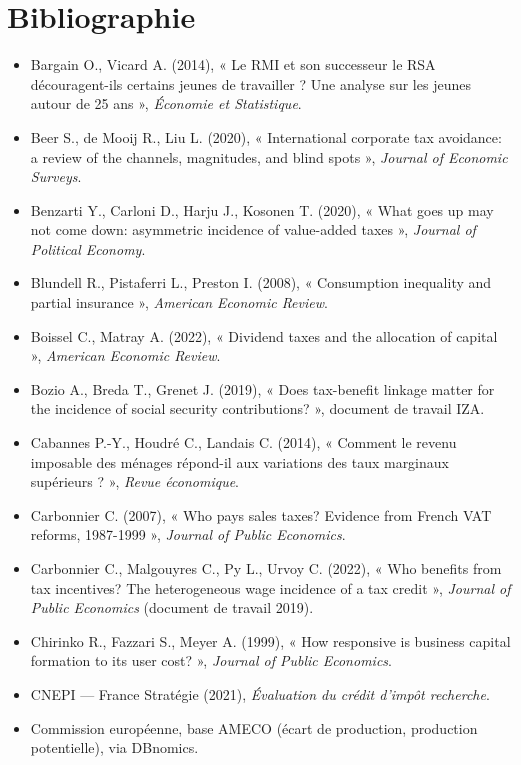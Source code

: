 \chapter*{Bibliographie}
\begin{itemize}\small
\item Bargain O., Vicard A. (2014), « Le RMI et son successeur le RSA découragent-ils certains jeunes de travailler ? Une analyse sur les jeunes autour de 25 ans », \emph{Économie et Statistique}.
\item Beer S., de Mooij R., Liu L. (2020), « International corporate tax avoidance: a review of the channels, magnitudes, and blind spots », \emph{Journal of Economic Surveys}.
\item Benzarti Y., Carloni D., Harju J., Kosonen T. (2020), « What goes up may not come down: asymmetric incidence of value-added taxes », \emph{Journal of Political Economy}.
\item Blundell R., Pistaferri L., Preston I. (2008), « Consumption inequality and partial insurance », \emph{American Economic Review}.
\item Boissel C., Matray A. (2022), « Dividend taxes and the allocation of capital », \emph{American Economic Review}.
\item Bozio A., Breda T., Grenet J. (2019), « Does tax-benefit linkage matter for the incidence of social security contributions? », document de travail IZA.
\item Cabannes P.-Y., Houdré C., Landais C. (2014), « Comment le revenu imposable des ménages répond-il aux variations des taux marginaux supérieurs ? », \emph{Revue économique}.
\item Carbonnier C. (2007), « Who pays sales taxes? Evidence from French VAT reforms, 1987-1999 », \emph{Journal of Public Economics}.
\item Carbonnier C., Malgouyres C., Py L., Urvoy C. (2022), « Who benefits from tax incentives? The heterogeneous wage incidence of a tax credit », \emph{Journal of Public Economics} (document de travail 2019).
\item Chirinko R., Fazzari S., Meyer A. (1999), « How responsive is business capital formation to its user cost? », \emph{Journal of Public Economics}.
\item CNEPI — France Stratégie (2021), \emph{Évaluation du crédit d'impôt recherche}.
\item Commission européenne, base AMECO (écart de production, production potentielle), via DBnomics.

\end{itemize}
